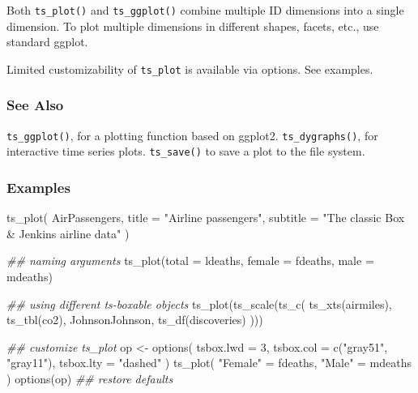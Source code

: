 \documentclass[
  letterpaper,
  DIV=11,
  numbers=noendperiod]{scrreport}
\newenvironment{Shaded}{\begin{snugshade}}{\end{snugshade}}
\newcommand{\AttributeTok}[1]{\textcolor[rgb]{0.40,0.45,0.13}{#1}}
\newcommand{\DecValTok}[1]{\textcolor[rgb]{0.68,0.00,0.00}{#1}}
\newcommand{\DocumentationTok}[1]{\textcolor[rgb]{0.37,0.37,0.37}{\textit{#1}}}
\newcommand{\FunctionTok}[1]{\textcolor[rgb]{0.28,0.35,0.67}{#1}}
\newcommand{\NormalTok}[1]{\textcolor[rgb]{0.00,0.23,0.31}{#1}}
\newcommand{\OtherTok}[1]{\textcolor[rgb]{0.00,0.23,0.31}{#1}}
\newcommand{\StringTok}[1]{\textcolor[rgb]{0.13,0.47,0.30}{#1}}
\begin{document}
Both \texttt{ts\_plot()} and \texttt{ts\_ggplot()} combine multiple ID
dimensions into a single dimension. To plot multiple dimensions in
different shapes, facets, etc., use standard ggplot.

Limited customizability of \texttt{ts\_plot} is available via options.
See examples.

\subsubsection{See Also}\label{see-also-4}

\texttt{ts\_ggplot()}, for a plotting function based on ggplot2.
\texttt{ts\_dygraphs()}, for interactive time series plots.
\texttt{ts\_save()} to save a plot to the file system.

\subsubsection{Examples}\label{examples-61}

\begin{Shaded}
\begin{Highlighting}[]
\FunctionTok{ts\_plot}\NormalTok{(}
\NormalTok{  AirPassengers,}
  \AttributeTok{title =} \StringTok{"Airline passengers"}\NormalTok{,}
  \AttributeTok{subtitle =} \StringTok{"The classic Box \& Jenkins airline data"}
\NormalTok{)}

\DocumentationTok{\#\# naming arguments}
\FunctionTok{ts\_plot}\NormalTok{(}\AttributeTok{total =}\NormalTok{ ldeaths, }\AttributeTok{female =}\NormalTok{ fdeaths, }\AttributeTok{male =}\NormalTok{ mdeaths)}

\DocumentationTok{\#\# using different ts{-}boxable objects}
\FunctionTok{ts\_plot}\NormalTok{(}\FunctionTok{ts\_scale}\NormalTok{(}\FunctionTok{ts\_c}\NormalTok{(}
  \FunctionTok{ts\_xts}\NormalTok{(airmiles),}
  \FunctionTok{ts\_tbl}\NormalTok{(co2),}
\NormalTok{  JohnsonJohnson,}
  \FunctionTok{ts\_df}\NormalTok{(discoveries)}
\NormalTok{)))}

\DocumentationTok{\#\# customize ts\_plot}
\NormalTok{op }\OtherTok{\textless{}{-}} \FunctionTok{options}\NormalTok{(}
  \AttributeTok{tsbox.lwd =} \DecValTok{3}\NormalTok{,}
  \AttributeTok{tsbox.col =} \FunctionTok{c}\NormalTok{(}\StringTok{"gray51"}\NormalTok{, }\StringTok{"gray11"}\NormalTok{),}
  \AttributeTok{tsbox.lty =} \StringTok{"dashed"}
\NormalTok{)}
\FunctionTok{ts\_plot}\NormalTok{(}
  \StringTok{"Female"} \OtherTok{=}\NormalTok{ fdeaths,}
  \StringTok{"Male"} \OtherTok{=}\NormalTok{ mdeaths}
\NormalTok{)}
\FunctionTok{options}\NormalTok{(op) }\DocumentationTok{\#\# restore defaults}
\end{Highlighting}
\end{Shaded}
\end{document}
